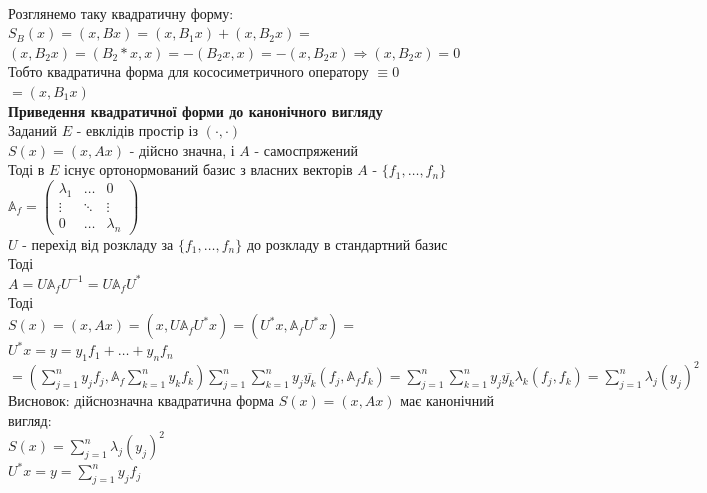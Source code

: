 \bigskip \\
Розглянемо таку квадратичну форму:\\
$S_B(x) = (x,Bx) = (x,B_1x) + (x,B_2x) \boxed{=} $\\
$(x,B_2x) = (B_2*x,x) = -(B_2x,x) = -(x,B_2x) \Rightarrow (x,B_2x) = 0$\\
Тобто квадратична форма для кососиметричного оператору $\equiv 0$\\
$\boxed{=} (x,B_1x)$
\bigskip \\
\textbf{Приведення квадратичної форми до канонічного вигляду}\\
Заданий $E$ - евклідів простір із $(\cdot,\cdot)$\\
$S(x) = (x,Ax)$ - дійсно значна, і $A$ - самоспряжений\\
Тоді в $E$ існує ортонормований базис з власних векторів $A$ - $\{f_1,\dots,f_n\}$\\
$\mathbb{A}_f = \begin{pmatrix}
\lambda_1 & \dots & 0 \\
\vdots & \ddots & \vdots \\
0 & \dots & \lambda_n
\end{pmatrix}$\\
$U$ - перехід від розкладу за $\{f_1,\dots,f_n\}$ до розкладу в стандартний базис\\
Тоді\\
$A = U \mathbb{A}_{f} U^{-1} = U \mathbb{A}_{f} U^{*}$\\
Тоді\\
$S(x) = (x,Ax) = (x,U \mathbb{A}_{f} U^{*} x) = (U^*x, \mathbb{A}_{f} U^{*} x) =$\\
$U^* x = y = y_1f_1 + \dots + y_nf_n$\\
$= \displaystyle \left(\sum_{j=1}^n y_jf_j, \mathbb{A}_{f} \sum_{k=1}^n y_k f_k \right) \sum_{j=1}^n \sum_{k=1}^n y_j \overline{y_k} (f_j, \mathbb{A}_f f_k) = \sum_{j=1}^n \sum_{k=1}^n y_j \overline{y_k} \lambda_k (f_j,f_k) = \sum_{j=1}^n \lambda_j (y_j)^2$\\
Висновок: дійснозначна квадратична форма $S(x) = (x,Ax)$ має канонічний вигляд:\\
$S(x) = \displaystyle \sum_{j=1}^n \lambda_j (y_j)^2$\\
$U^*x = y = \displaystyle \sum_{j=1}^n y_j f_j$\\
